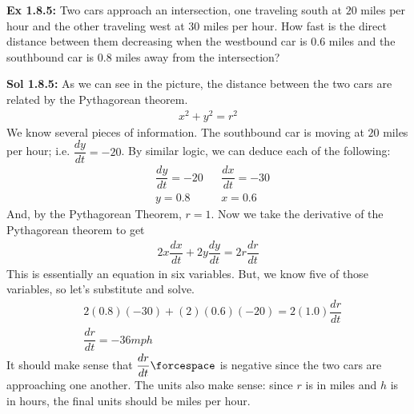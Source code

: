 \begin{tcolorbox}[example]
    \textbf{Ex 1.8.5: } Two cars approach an intersection, one traveling south at $20$ miles per hour and the other traveling west at $30$ miles per hour. How fast is the direct distance between them decreasing when the westbound car is $0.6$ miles and the southbound car is $0.8$ miles away from the intersection? \\[11pt]

    \begin{center}
    \end{center}
\end{tcolorbox}
\begin{tcolorbox}[solution]
    \textbf{Sol 1.8.5: } As we can see in the picture, the distance between the two cars are related by the Pythagorean theorem. \begin{align*}
        x^2 + y^2 = r^2
    \end{align*}
    We know several pieces of information. The southbound car is moving at $20$ miles per hour; i.e. $\dfrac{dy}{dt} = -20$. By similar logic, we can deduce each of the following: \begin{align*}
        & \dfrac{dy}{dt} = -20 && \dfrac{dx}{dt} = -30 \\[11pt]
        & y = 0.8 && x = 0.6
    \end{align*}
    And, by the Pythagorean Theorem, $r = 1$. Now we take the derivative of the Pythagorean theorem to get \begin{align*}
        2x\dfrac{dx}{dt} + 2y\dfrac{dy}{dt} = 2r\dfrac{dr}{dt}
    \end{align*}
    This is essentially an equation in six variables. But, we know five of those variables, so let's substitute and solve. \begin{align*}
        & 2(0.8)(-30) + (2)(0.6)(-20) = 2(1.0)\dfrac{dr}{dt} \\[11pt]
        & \dfrac{dr}{dt} = \boxed{-36 \si{mph}}
    \end{align*}
    It should make sense that $\dfrac{dr}{dt} \forcespace$ is negative since the two cars are approaching one another. The units also make sense: since $r$ is in miles and $h$ is in hours, the final units should be miles per hour.
\end{tcolorbox}

